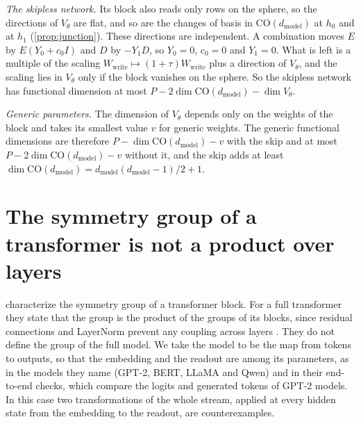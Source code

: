 \documentclass[10pt]{article}
\theoremstyle{definition}
\theoremstyle{remark}
\newcommand{\Wwrite}{W_{\mathrm{write}}}
\newcommand{\dm}{d_{\mathrm{model}}}
\newcommand{\CO}{\mathrm{CO}}
\begin{document}
\emph{The skipless network.} Its block also reads only rows on the sphere, so the directions of $V_\theta$ are flat, and so are the changes of basis in $\CO(\dm)$ at $h_0$ and at $h_1$ (\cref{prop:junction}). These directions are independent. A combination moves $E$ by $E(Y_0 + c_0I)$ and $D$ by $-Y_1D$, so $Y_0 = 0$, $c_0 = 0$ and $Y_1 = 0$. What is left is a multiple of the scaling $\Wwrite \mapsto (1+\tau)\Wwrite$ plus a direction of $V_\theta$, and the scaling lies in $V_\theta$ only if the block vanishes on the sphere. So the skipless network has functional dimension at most $P - 2\dim\CO(\dm) - \dim V_\theta$.

\emph{Generic parameters.} The dimension of $V_\theta$ depends only on the weights of the block and takes its smallest value $v$ for generic weights. The generic functional dimensions are therefore $P - \dim\CO(\dm) - v$ with the skip and at most $P - 2\dim\CO(\dm) - v$ without it, and the skip adds at least $\dim\CO(\dm) = \dm(\dm-1)/2 + 1$.

\FloatBarrier
\section{The symmetry group of a transformer is not a product over layers}\label{app:product}

\citet{wang2025gauge} characterize the symmetry group of a transformer block. For a full transformer they state that the group is the product of the groups of its blocks, since residual connections and LayerNorm prevent any coupling across layers \citep[Theorem~7]{wang2025gauge}. They do not define the group of the full model. We take the model to be the map from tokens to outputs, so that the embedding and the readout are among its parameters, as in the models they name (GPT-2, BERT, LLaMA and Qwen) and in their end-to-end checks, which compare the logits and generated tokens of GPT-2 models. In this case two transformations of the whole stream, applied at every hidden state from the embedding to the readout, are counterexamples.
\end{document}
